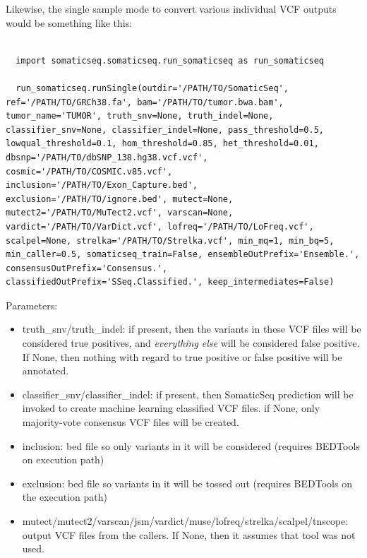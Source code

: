 \documentclass[10pt,letterpaper]{article}
\begin{document}
\begin{sloppypar}
Likewise, the single sample mode to convert various individual VCF outputs would be something like this:

\begin{lstlisting}

  import somaticseq.somaticseq.run_somaticseq as run_somaticseq
  
  run_somaticseq.runSingle(outdir='/PATH/TO/SomaticSeq', ref='/PATH/TO/GRCh38.fa', bam='/PATH/TO/tumor.bwa.bam', tumor_name='TUMOR', truth_snv=None, truth_indel=None, classifier_snv=None, classifier_indel=None, pass_threshold=0.5, lowqual_threshold=0.1, hom_threshold=0.85, het_threshold=0.01, dbsnp='/PATH/TO/dbSNP_138.hg38.vcf.vcf', cosmic='/PATH/TO/COSMIC.v85.vcf', inclusion='/PATH/TO/Exon_Capture.bed', exclusion='/PATH/TO/ignore.bed', mutect=None, mutect2='/PATH/TO/MuTect2.vcf', varscan=None, vardict='/PATH/TO/VarDict.vcf', lofreq='/PATH/TO/LoFreq.vcf', scalpel=None, strelka='/PATH/TO/Strelka.vcf', min_mq=1, min_bq=5, min_caller=0.5, somaticseq_train=False, ensembleOutPrefix='Ensemble.', consensusOutPrefix='Consensus.', classifiedOutPrefix='SSeq.Classified.', keep_intermediates=False)

\end{lstlisting}


Parameters:

\begin{itemize}

\item truth\_snv/truth\_indel: if present, then the variants in these VCF files will be considered true positives, and \emph{everything else} will be considered false positive. If None, then nothing with regard to true positive or false positive will be annotated. 

\item classifier\_snv/classifier\_indel: if present, then SomaticSeq prediction will be invoked to create machine learning classified VCF files. if None, only majority-vote consensus VCF files will be created. 

\item inclusion: bed file so only variants in it will be considered (requires BEDTools on execution path)

\item exclusion: bed file so variants in it will be tossed out (requires BEDTools on the execution path)

\item mutect/mutect2/varscan/jsm/vardict/muse/lofreq/strelka/scalpel/tnscope: output VCF files from the callers. If None, then it assumes that tool was not used. 


\end{itemize}
\end{sloppypar}
\end{document}
